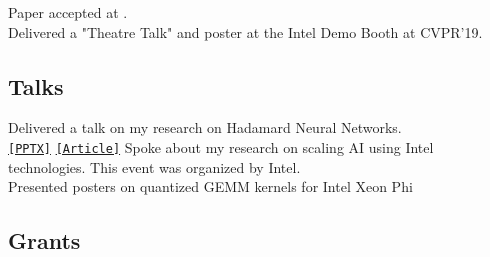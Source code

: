 \documentclass[]{deedy-resume-openfont}
\begin{document}
Paper accepted at . \\ 
Delivered a "Theatre Talk" and poster at the Intel Demo Booth at CVPR'19.\\
\sectionsep

\sectionsep
\vspace{1mm}

\clearpage

\subsection{Talks}
Delivered a talk on my research on Hadamard Neural Networks. \\

\sectionsep
{}
\href{https://docs.google.com/presentation/d/1PuxUM6RmDI5Dq7XgFoVWNxv_TOQ3aux8GiQ9aWlpUjg/edit?usp=sharing}{\texttt{[PPTX]}} \href{https://software.intel.com/en-us/articles/developing-hadamard-neural-networks-on-the-intel-xeon-scalable-processor}{\texttt{[Article]}}
Spoke about my research on scaling AI using Intel technologies. This event was organized by Intel. \\

\sectionsep
{}
Presented posters on quantized GEMM kernels for Intel Xeon Phi\\
\vspace{1mm}
\sectionsep


\subsection{Grants}
\end{document}
